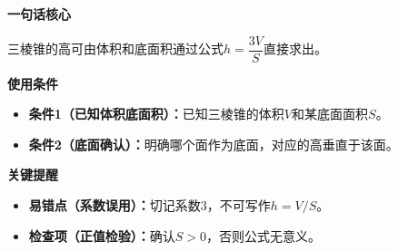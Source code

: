 \begin{summarybox}

	\textbf{\textcolor{CSummary}{一句话核心}}

	三棱锥的高可由体积和底面积通过公式$h=\dfrac{3V}{S}$直接求出。

	\medskip
	\textbf{\textcolor{CSummary}{使用条件}}
	\begin{itemize}[leftmargin=*, itemsep=0.5em, topsep=0.4em]
		\item \textbf{条件1（已知体积底面积）：}已知三棱锥的体积$V$和某底面面积$S$。
		\item \textbf{条件2（底面确认）：}明确哪个面作为底面，对应的高垂直于该面。
	\end{itemize}

	\medskip
	\textbf{\textcolor{CSummary}{关键提醒}}
	\begin{itemize}[leftmargin=*, itemsep=0.5em, topsep=0.4em]
		\item \textbf{易错点（系数误用）：}切记系数$3$，不可写作$h=V/S$。
		\item \textbf{检查项（正值检验）：}确认$S>0$，否则公式无意义。
	\end{itemize}
\end{summarybox}
